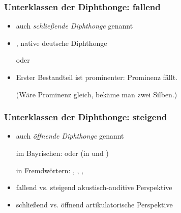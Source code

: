 \begin{frame}
\frametitle{Unterklassen der Diphthonge: fallend}
		
		\begin{itemize}
			
			\item auch \emph{schließende Diphthonge} genannt
			\item {}, native deutsche Diphthonge

			\ea {} oder 
			\z

			\item Erster Bestandteil ist prominenter: Prominenz fällt.\par
				(Wäre Prominenz gleich, bekäme man zwei Silben.)
				
			\end{itemize}
	
\end{frame}
\begin{frame}
\frametitle{Unterklassen der Diphthonge: steigend}		

		\begin{itemize}	
			\item auch \emph{öffnende Diphthonge} genannt

			\ea im Bayrischen: \textipa{[ \t{ɪa} , \t{ʊa} ]} oder  (in  und )
			\z
			
			\ea in Fremdwörtern: , , , 
			\z
			
			\item fallend vs. steigend \ras akustisch-auditive Perspektive
			\item schließend vs. öffnend \ras artikulatorische Perspektive
		\end{itemize}
		
\end{frame}


